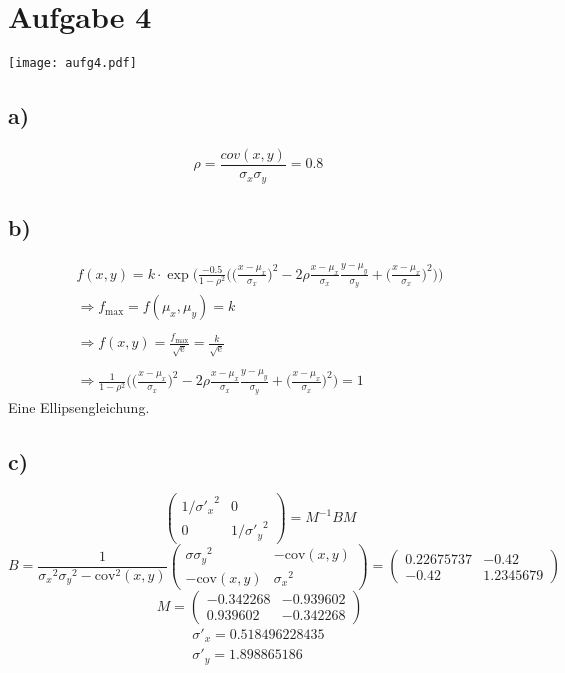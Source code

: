 \newpage\section{Aufgabe 4}
\texttt{[image: aufg4.pdf]}
\subsection{a)}
\begin{equation*}
\rho = \frac{cov(x,y)}{\sigma_x\sigma_y} = \SI{0.8}{}
\end{equation*}
\subsection{b)}
\begin{align*}
f(x,y) = k \cdot \exp \Biggl(\frac{-0.5}{1-\rho^2}\Biggl(\biggl(\frac{x-\mu_x}{\sigma_x}\biggr)^2-2\rho\frac{x-\mu_x}{\sigma_x}\frac{y-\mu_y}{\sigma_y}+\biggl(\frac{x-\mu_x}{\sigma_x}\biggr)^2\Biggr)\Biggr)\\
\Rightarrow f_\text{max}=f(\mu_x,\mu_y)=k\\
\\
\Rightarrow f(x,y)=\frac{f_\text{max}}{\sqrt{\text{e}}}=\frac{k}{\sqrt{\text{e}}}\\
\\
\Rightarrow \frac{1}{1-\rho^2}\Biggl(\biggl(\frac{x-\mu_x}{\sigma_x}\biggr)^2-2\rho\frac{x-\mu_x}{\sigma_x}\frac{y-\mu_y}{\sigma_y}+\biggl(\frac{x-\mu_x}{\sigma_x}\biggr)^2\Biggr) = 1
\end{align*}
Eine Ellipsengleichung.
\subsection{c)}
\begin{equation*}
\begin{pmatrix}
1/{\sigma'_x}^2 & 0\\0 & 1/{\sigma'_y}^2
\end{pmatrix}= M^{-1} B M
\end{equation*}
\begin{equation*}
B = \frac{1}{{\sigma_x}^2{\sigma_y}^2-\text{cov}^2(x,y)}\begin{pmatrix}
\sigma{\sigma_y}^2 & -\text{cov}(x,y)\\-\text{cov}(x,y) & {\sigma_x}^2\end{pmatrix} = \begin{pmatrix} 0.22675737 & -0.42 \\-0.42 &  1.2345679\end{pmatrix}
\end{equation*}
\begin{equation*}
M =  \begin{pmatrix}-0.342268 & -0.939602\\0.939602 &-0.342268\end{pmatrix}
\end{equation*}
\begin{align*}
\sigma'_x = \SI{ 0.518496228435}{}\\
\sigma'_y = \SI{ 1.898865186}{}
\end{align*}
